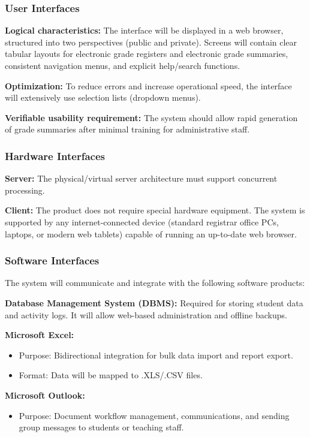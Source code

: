 \documentclass[11pt, a4paper]{article}
\begin{document}
\subsubsection{User Interfaces}
\textbf{Logical characteristics:}
The interface will be displayed in a web browser, structured into two perspectives (public and private). Screens will contain clear tabular layouts for electronic grade registers and electronic grade summaries, consistent navigation menus, and explicit help/search functions.

\textbf{Optimization:}
To reduce errors and increase operational speed, the interface will extensively use selection lists (dropdown menus).

\textbf{Verifiable usability requirement:}
The system should allow rapid generation of grade summaries after minimal training for administrative staff.

\subsubsection{Hardware Interfaces}
\textbf{Server:}
The physical/virtual server architecture must support concurrent processing.

\textbf{Client:}
The product does not require special hardware equipment. The system is supported by any internet-connected device (standard registrar office PCs, laptops, or modern web tablets) capable of running an up-to-date web browser.

\subsubsection{Software Interfaces}
The system will communicate and integrate with the following software products:

\textbf{Database Management System (DBMS):}
Required for storing student data and activity logs. It will allow web-based administration and offline backups.

\textbf{Microsoft Excel:}
\begin{itemize}
    \item Purpose: Bidirectional integration for bulk data import and report export.
    \item Format: Data will be mapped to .XLS/.CSV files.
\end{itemize}

\textbf{Microsoft Outlook:}
\begin{itemize}
    \item Purpose: Document workflow management, communications, and sending group messages to students or teaching staff.
\end{itemize}
\end{document}
